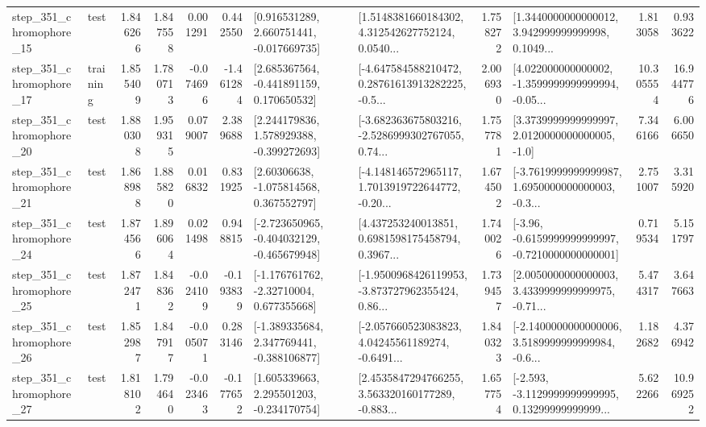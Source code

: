 \begin{tabular}{llrrrrllrlrr}
  step\_351\_chromophore\_15 &      test &      1.846266 &    1.847558 &      0.001291 &  0.442550 &    [0.916531289, 2.660751441, -0.017669735] &  [1.5148381660184302, 4.312542627752124, 0.0540... &       1.758272 &  [1.3440000000000012, 3.942999999999998, 0.1049... &            1.813058 &          0.933622 \\
  step\_351\_chromophore\_17 &  training &      1.855409 &    1.780713 &     -0.074696 & -1.461284 &    [2.685367564, -0.441891159, 0.170650532] &  [-4.647584588210472, 0.28761613913282225, -0.5... &       2.006930 &  [4.022000000000002, -1.3599999999999994, -0.05... &           10.305554 &         16.944776 \\
  step\_351\_chromophore\_20 &      test &      1.880308 &    1.959315 &      0.079007 &  2.389688 &    [2.244179836, 1.578929388, -0.399272693] &  [-3.682363675803216, -2.5286999302767055, 0.74... &       1.757781 &     [3.3739999999999997, 2.0120000000000005, -1.0] &            7.346166 &          6.006650 \\
  step\_351\_chromophore\_21 &      test &      1.868988 &    1.885820 &      0.016832 &  0.831925 &     [2.60306638, -1.075814568, 0.367552797] &  [-4.148146572965117, 1.7013919722644772, -0.20... &       1.674502 &  [-3.7619999999999987, 1.6950000000000003, -0.3... &            2.751007 &          3.315920 \\
  step\_351\_chromophore\_24 &      test &      1.874566 &    1.896064 &      0.021498 &  0.948815 &  [-2.723650965, -0.404032129, -0.465679948] &  [4.437253240013851, 0.6981598175458794, 0.3967... &       1.740026 &  [-3.96, -0.6159999999999997, -0.7210000000000001] &            0.719534 &          5.151797 \\
  step\_351\_chromophore\_25 &      test &      1.872471 &    1.848362 &     -0.024109 & -0.193839 &    [-1.176761762, -2.32710004, 0.677355668] &  [-1.9500968426119953, -3.873727962355424, 0.86... &       1.739457 &  [2.0050000000000003, 3.4339999999999975, -0.71... &            5.474317 &          3.647663 \\
  step\_351\_chromophore\_26 &      test &      1.852987 &    1.847917 &     -0.005071 &  0.283146 &   [-1.389335684, 2.347769441, -0.388106877] &  [-2.057660523083823, 4.04245561189274, -0.6491... &       1.840323 &  [-2.1400000000000006, 3.5189999999999984, -0.6... &            1.182682 &          4.376942 \\
  step\_351\_chromophore\_27 &      test &      1.818102 &    1.794640 &     -0.023463 & -0.177652 &    [1.605339663, 2.295501203, -0.234170754] &  [2.4535847294766255, 3.563320160177289, -0.883... &       1.657754 &  [-2.593, -3.1129999999999995, 0.13299999999999... &            5.622266 &         10.969252 \\

\end{tabular}

